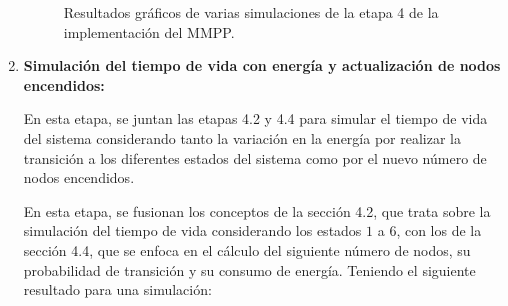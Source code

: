 \begin{enumerate}[label=\arabic*.]
\begin{figure}[H]
    \centering
    \quad
    \caption{Resultados gráficos de varias simulaciones de la etapa 4 de la implementación del MMPP.}
\end{figure}


\item \textbf{Simulación del tiempo de vida con energía y actualización de nodos encendidos:}

En esta etapa, se juntan las etapas 4.2 y 4.4 para simular el tiempo de vida del sistema considerando tanto la variación en la energía por realizar la transición a los diferentes estados del sistema como por el nuevo número de nodos encendidos.

En esta etapa, se fusionan los conceptos de la sección 4.2, que trata sobre la simulación del tiempo de vida considerando los estados $1$ a $6$, con los de la sección 4.4, que se enfoca en el cálculo del siguiente número de nodos, su probabilidad de transición y su consumo de energía. Teniendo el siguiente resultado para una simulación:


\end{enumerate}
